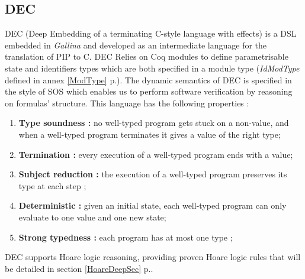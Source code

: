 \subsection{DEC}
DEC (Deep Embedding of a
terminating C-style language with effects) is a \gls{DSL} embedded in \textit{Gallina} and developed as an intermediate language for
the translation of PIP to C. DEC Relies on Coq modules to define parametrisable state and identifiers types which are both specified in a module type (\textit{IdModType} defined in annex \ref{ModType} p.\pageref{ModType}). The dynamic semantics of DEC is specified in the style of
\gls{SOS} which enables us to perform software verification by reasoning on formulas' structure.
This language has the following properties : 
\begin{enumerate}
	\item \textbf{Type soundness :} no well-typed program gets stuck on a
non-value, and when a well-typed program terminates it gives a value
of the right type;
	\item \textbf{Termination :} every execution of a well-typed program
ends with a value;
	\item \textbf{Subject reduction :} the execution of a well-typed
program preserves its type at each step ;
	\item \textbf{Deterministic  :} given an initial state, each well-typed
program can only evaluate to one value and one new state;
	\item \textbf{Strong typedness :} each program has at most one
type ;	
\end{enumerate}
DEC supports Hoare logic reasoning, providing proven Hoare logic rules that will be detailed in section \ref{HoareDeepSec} p.\pageref{HoareDeepSec}.

